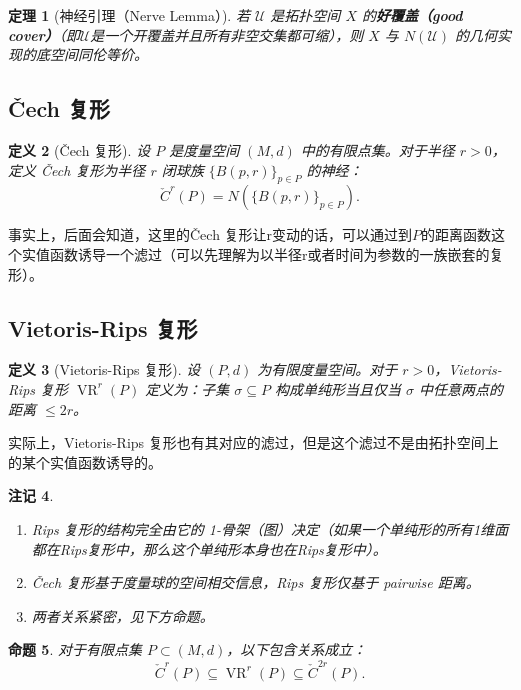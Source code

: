 \documentclass[UTF8]{ctexart}
\newtheorem{definition}{定义}[section]
\newtheorem{proposition}[definition]{命题}
\newtheorem{remark}[definition]{注记}
\newtheorem{theorem}[definition]{定理}
\begin{document}
\begin{theorem}[神经引理（Nerve Lemma）]
\label{thm:nerve-lemma}
若 \(\mathcal{U}\) 是拓扑空间 \(X\) 的\textbf{好覆盖（good cover）}（即\(\mathcal{U}\)是一个开覆盖并且所有非空交集都可缩），则 \(X\) 与 \(N(\mathcal{U})\) 的几何实现的底空间同伦等价。
\end{theorem}

\subsection{Čech 复形}
\label{subsec:cech-complex}

\begin{definition}[Čech 复形]
\label{def:cech-complex}
设 \(P\) 是度量空间 \((M,d)\) 中的有限点集。对于半径 \(r>0\)，定义 Čech 复形为半径 \(r\) 闭球族 \(\{B(p,r)\}_{p\in P}\) 的神经：
\[
\check{C}^r(P) = N(\{B(p,r)\}_{p\in P}).
\]
\end{definition}

事实上，后面会知道，这里的Čech 复形让r变动的话，可以通过到$P$的距离函数这个实值函数诱导一个滤过（可以先理解为以半径r或者时间为参数的一族嵌套的复形）。

\subsection{Vietoris-Rips 复形}
\label{subsec:rips-complex}

\begin{definition}[Vietoris-Rips 复形]
\label{def:rips-complex}
设 \((P,d)\) 为有限度量空间。对于 \(r>0\)，Vietoris-Rips 复形 \(\operatorname{VR}^r(P)\) 定义为：子集 \(\sigma \subseteq P\) 构成单纯形当且仅当 \(\sigma\) 中任意两点的距离 \(\le 2r\)。
\end{definition}
实际上，Vietoris-Rips 复形也有其对应的滤过，但是这个滤过不是由拓扑空间上的某个实值函数诱导的。

\begin{remark}
\begin{enumerate}
    \item Rips 复形的结构完全由它的 1-骨架（图）决定（如果一个单纯形的所有1维面都在Rips复形中，那么这个单纯形本身也在Rips复形中）。
    \item Čech 复形基于度量球的空间相交信息，Rips 复形仅基于 pairwise 距离。
    \item 两者关系紧密，见下方命题。
\end{enumerate}
\end{remark}

\begin{proposition}
\label{prop:cech-rips-interleaving}
对于有限点集 \(P \subset (M,d)\)，以下包含关系成立：
\[
\check{C}^r(P) \subseteq \operatorname{VR}^r(P) \subseteq \check{C}^{2r}(P).
\]
\end{proposition}
\end{document}
